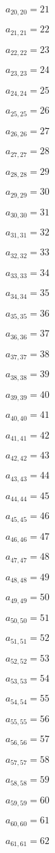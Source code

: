 \documentclass[a4paper,12pt]{article}
\begin{document}
$a _{ 20, 20 } = 21$

$a _{ 21, 21 } = 22$

$a _{ 22, 22 } = 23$

$a _{ 23, 23 } = 24$

$a _{ 24, 24 } = 25$

$a _{ 25, 25 } = 26$

$a _{ 26, 26 } = 27$

$a _{ 27, 27 } = 28$

$a _{ 28, 28 } = 29$

$a _{ 29, 29 } = 30$

$a _{ 30, 30 } = 31$

$a _{ 31, 31 } = 32$

$a _{ 32, 32 } = 33$

$a _{ 33, 33 } = 34$

$a _{ 34, 34 } = 35$

$a _{ 35, 35 } = 36$

$a _{ 36, 36 } = 37$

$a _{ 37, 37 } = 38$

$a _{ 38, 38 } = 39$

$a _{ 39, 39 } = 40$

$a _{ 40, 40 } = 41$

$a _{ 41, 41 } = 42$

$a _{ 42, 42 } = 43$

$a _{ 43, 43 } = 44$

$a _{ 44, 44 } = 45$

$a _{ 45, 45 } = 46$

$a _{ 46, 46 } = 47$

$a _{ 47, 47 } = 48$

$a _{ 48, 48 } = 49$

$a _{ 49, 49 } = 50$

$a _{ 50, 50 } = 51$

$a _{ 51, 51 } = 52$

$a _{ 52, 52 } = 53$

$a _{ 53, 53 } = 54$

$a _{ 54, 54 } = 55$

$a _{ 55, 55 } = 56$

$a _{ 56, 56 } = 57$

$a _{ 57, 57 } = 58$

$a _{ 58, 58 } = 59$

$a _{ 59, 59 } = 60$

$a _{ 60, 60 } = 61$

$a _{ 61, 61 } = 62$
\end{document}
